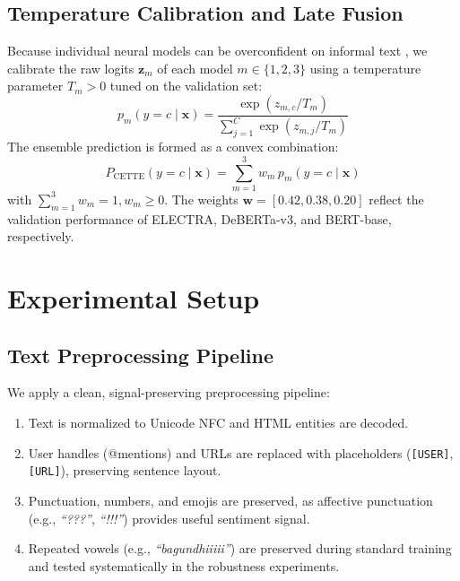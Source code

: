 \documentclass[10pt,conference]{IEEEtran}
\begin{document}
\subsection{Temperature Calibration and Late Fusion}
Because individual neural models can be overconfident on informal text \cite{guo2017}, we calibrate the raw logits $\mathbf{z}_m$ of each model $m \in \{1, 2, 3\}$ using a temperature parameter $T_m > 0$ tuned on the validation set:
\begin{equation}
p_m(y=c \mid \mathbf{x}) = \frac{\exp\left(z_{m,c} / T_m\right)}{\sum_{j=1}^C \exp\left(z_{m,j} / T_m\right)}
\end{equation}
The ensemble prediction is formed as a convex combination:
\begin{equation}
P_{\text{CETTE}}(y=c \mid \mathbf{x}) = \sum_{m=1}^3 w_m \, p_m(y=c \mid \mathbf{x})
\end{equation}
with $\sum_{m=1}^3 w_m = 1, w_m \ge 0$. The weights $\mathbf{w} = [0.42, 0.38, 0.20]$ reflect the validation performance of ELECTRA, DeBERTa-v3, and BERT-base, respectively.

\section{Experimental Setup}
\subsection{Text Preprocessing Pipeline}
We apply a clean, signal-preserving preprocessing pipeline:
\begin{enumerate}
    \item Text is normalized to Unicode NFC and HTML entities are decoded.
    \item User handles (@mentions) and URLs are replaced with placeholders (\texttt{[USER]}, \texttt{[URL]}), preserving sentence layout.
    \item Punctuation, numbers, and emojis are preserved, as affective punctuation (e.g., \textit{``???''}, \textit{``!!!''}) provides useful sentiment signal.
    \item Repeated vowels (e.g., \textit{``bagundhiiiii''}) are preserved during standard training and tested systematically in the robustness experiments.
\end{enumerate}
\end{document}
